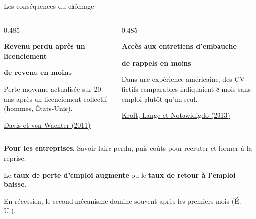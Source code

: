 \documentclass[aspectratio=169]{beamer}
\begin{document}
\begin{frame}{Les conséquences du chômage}
   \begin{columns}[T,onlytextwidth]
      \begin{column}{0.485\textwidth}
         \begin{tcolorbox}[consequenceemploi]
            \small\textbf{\textcolor{HECnavy}{Revenu perdu après un licenciement}}\par\smallskip
            {\bfseries\color{HECcoral}{\Large 12\,\%} de revenu en moins}\par\smallskip
            \footnotesize
            Perte moyenne actualisée sur 20 ans après un licenciement collectif
            (hommes, États-Unis).\par\smallskip
            {\scriptsize\hfill\href{https://www.brookings.edu/articles/recessions-and-the-costs-of-job-loss/}{Davis et von Wachter (2011)}\par}
         \end{tcolorbox}
      \end{column}
      \begin{column}{0.485\textwidth}
         \begin{tcolorbox}[consequenceemploi]
            \small\textbf{\textcolor{HECnavy}{Accès aux entretiens d'embauche}}\par\smallskip
            {\bfseries\color{HECcoral}{\Large \(\approx\) 45\,\%} de rappels en moins}\par\smallskip
            \footnotesize
            Dans une expérience américaine, des CV fictifs comparables
            indiquaient 8 mois sans emploi plutôt qu'un seul.\par\smallskip
            {\scriptsize\hfill\href{https://doi.org/10.1093/qje/qjt015}{Kroft, Lange et Notowidigdo (2013)}\par}
         \end{tcolorbox}
      \end{column}
   \end{columns}

   \vspace{0.32cm}
   {\footnotesize\RaggedRight
      \textbf{Pour les entreprises.} Savoir-faire perdu, puis coûts pour recruter et former à la reprise.\par}
   \vspace{0.10cm}
   \begin{keyinsight}
      \footnotesize\RaggedRight{}
      Le \textbf{taux de perte d'emploi augmente} ou le \textbf{taux de retour à l'emploi baisse}.\par
      En récession, le second mécanisme domine souvent après les premiers mois (É.-U.).
   \end{keyinsight}
\end{frame}
\end{document}
